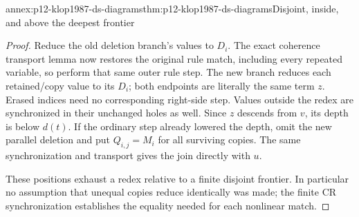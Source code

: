 \begin{annexitem}{annex:p12-klop1987-ds-diagrams}{thm:p12-klop1987-ds-diagrams}{Disjoint, inside, and above the deepest frontier}
\begin{proof}
Reduce the old deletion branch's values to \(D_i\). The exact
coherence transport lemma now restores the original rule match,
including every repeated variable, so perform that same outer
rule step. The new branch reduces each retained/copy value to
its \(D_i\); both endpoints are literally the same term \(z\).
Erased indices need no corresponding right-side step. Values
outside the redex are synchronized in their unchanged holes as
well. Since \(z\) descends from \(v\), its depth is below
\(d(t)\). If the ordinary step already lowered the depth, omit
the new parallel deletion and put \(Q_{i,j}=M_i\) for all
surviving copies. The same synchronization and transport gives
the join directly with \(u\).

These positions exhaust a redex relative to a finite disjoint
frontier. In particular no assumption that unequal copies reduce
identically was made; the finite CR synchronization establishes
the equality needed for each nonlinear match.
\end{proof}
\end{annexitem}

